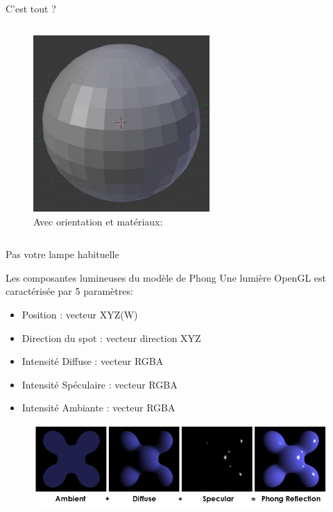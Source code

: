 \documentclass{beamer}
\begin{document}
\begin{frame}{C'est tout ?}
\begin{columns}
\begin{column}{0.5\textwidth}
\begin{figure}
				\includegraphics[width=0.6\textwidth]{img/shaded_sphere}
				\caption*{Avec orientation et matériaux:}
			\end{figure}
		\end{column}
	\end{columns}
\end{frame}

\begin{frame}{Pas votre lampe habituelle}
	\begin{block}{Les composantes lumineuses du modèle de Phong}
		Une lumière OpenGL est caractérisée par 5 paramètres:
		\begin{itemize}
			\item Position : vecteur XYZ(W)
			\item Direction du spot : vecteur direction XYZ
			\item Intensité Diffuse : vecteur RGBA
			\item Intensité Spéculaire : vecteur RGBA
			\item Intensité Ambiante : vecteur RGBA
		\end{itemize}
	\end{block}
	\begin{figure}
		\includegraphics[width=\textwidth]{img/phong}
	\end{figure}
\end{frame}
\end{document}
